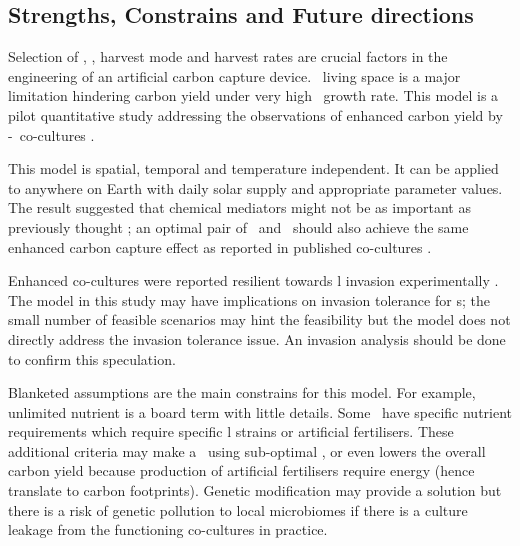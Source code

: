 \documentclass[../thesis.tex]{subfiles} %
\begin{document}
\subsection{Strengths, Constrains and Future directions}
Selection of \phy, \bac, harvest mode and harvest rates are crucial factors in the engineering of an artificial carbon capture device.  \Phy\ living space is a major limitation hindering carbon yield under very high \phy\ growth rate.  This model is a pilot quantitative study addressing the observations of enhanced carbon yield by \phy-\bac\ co-cultures \autocite{fuentes2016impact,santos2014microalgal}.

This model is spatial, temporal and temperature independent.  It can be applied to anywhere on Earth with daily solar supply and appropriate parameter values.  The result suggested that chemical mediators might not be as important as previously thought \autocite{fuentes2016impact}; an optimal pair of \phy\ and \bac\ should also achieve the same enhanced carbon capture effect as reported in published co-cultures \autocite{amin2009photolysis,rivas2010interactions,seyedsayamdost2011roseobacticides}.

Enhanced co-cultures were reported resilient towards \bac l invasion experimentally \autocite{fuentes2016impact,seyedsayamdost2011roseobacticides}.  The model in this study may have implications on invasion tolerance for \pbs s; the small number of feasible scenarios may hint the feasibility but the model does not directly address the invasion tolerance issue.  An invasion analysis should be done to confirm this speculation.

Blanketed assumptions are the main constrains for this model.  For example, unlimited nutrient is a board term with little details.  Some \phy\ have specific nutrient requirements \autocite{kazamia2012mutualistic} which require specific \bac l strains or artificial fertilisers.  These additional criteria may make a \pbs\ using sub-optimal \bac, or even lowers the overall carbon yield because production of artificial fertilisers require energy (hence translate to carbon footprints).  Genetic modification may provide a solution but there is a risk of genetic pollution to local microbiomes if there is a culture leakage from the functioning co-cultures in practice.
\end{document}
